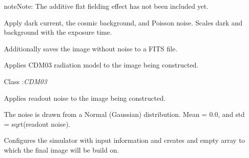 \documentclass[a4paper,12pt,english]{sphinxmanual}
\begin{document}
\begin{fulllineitems}
\begin{fulllineitems}
\begin{notice}{note}{Note:}
The additive flat fielding effect has not been included yet.
\end{notice}

\end{fulllineitems}


\begin{fulllineitems}
\label{simulator:simulator.simulator.VISsimulator.applyNoise}
Apply dark current, the cosmic background, and Poisson noise.
Scales dark and background with the exposure time.

Additionally saves the image without noise to a FITS file.

\end{fulllineitems}


\begin{fulllineitems}
\label{simulator:simulator.simulator.VISsimulator.applyRadiationDamage}
Applies CDM03 radiation model to the image being constructed.




Class :\emph{CDM03}



\end{fulllineitems}


\begin{fulllineitems}
\label{simulator:simulator.simulator.VISsimulator.applyReadoutNoise}
Applies readout noise to the image being constructed.

The noise is drawn from a Normal (Gaussian) distribution.
Mean = 0.0, and std = sqrt(readout noise).

\end{fulllineitems}


\begin{fulllineitems}
\label{simulator:simulator.simulator.VISsimulator.configure}
Configures the simulator with input information and creates and empty array to which the final image will
be build on.


\end{fulllineitems}
\end{fulllineitems}
\end{document}
